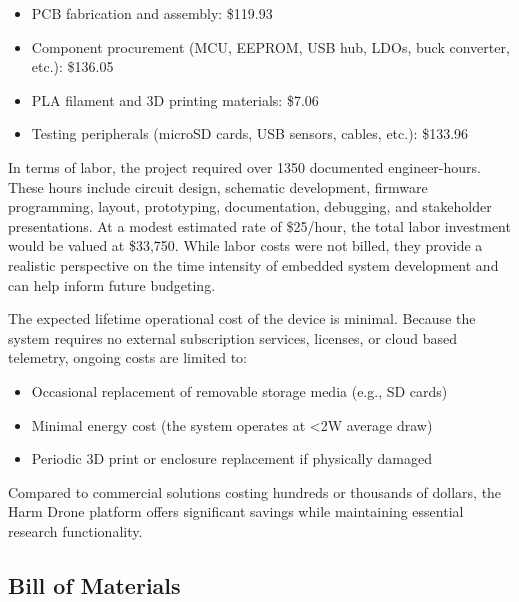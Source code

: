 \documentclass[12pt]{article}
\begin{document}
\begin{itemize}
\item PCB fabrication and assembly: \$119.93
\item Component procurement (MCU, EEPROM, USB hub, LDOs, buck converter, etc.): \$136.05
\item PLA filament and 3D printing materials: \$7.06
\item Testing peripherals (microSD cards, USB sensors, cables, etc.): \$133.96
\end{itemize}

\par In terms of labor, the project required over 1350 documented engineer-hours. These hours include circuit design, schematic development, firmware programming, layout, prototyping, documentation, debugging, and stakeholder presentations. At a modest estimated rate of \$25/hour, the total labor investment would be valued at \$33,750. While labor costs were not billed, they provide a realistic perspective on the time intensity of embedded system development and can help inform future budgeting.

\par The expected lifetime operational cost of the device is minimal. Because the system requires no external subscription services, licenses, or cloud based telemetry, ongoing costs are limited to:

\begin{itemize}
\item Occasional replacement of removable storage media (e.g., SD cards)
\item Minimal energy cost (the system operates at \textless 2W average draw)
\item Periodic 3D print or enclosure replacement if physically damaged
\end{itemize}

\par Compared to commercial solutions costing hundreds or thousands of dollars, the Harm Drone platform offers significant savings while maintaining essential research functionality.

\clearpage
\subsection{Bill of Materials}

\end{document}
